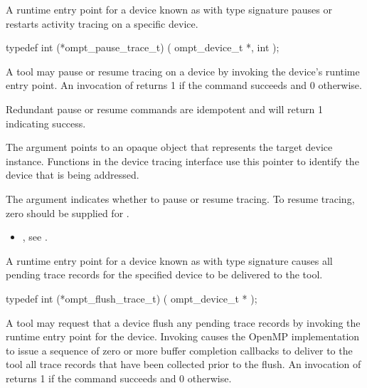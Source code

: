 \summary
A runtime entry point for a device known as 
with type signature 
pauses or restarts activity tracing on a specific device.

\begin{ccppspecific}
\begin{omptInquiry}
typedef int (*ompt_pause_trace_t) (
  ompt_device_t *,
  int 
);
\end{omptInquiry}
\end{ccppspecific}

\descr

A tool may pause or resume tracing on a device by invoking the device's
 runtime entry point.
An invocation of  returns 1 if the command
succeeds and 0 otherwise.

Redundant pause or resume commands are idempotent and will
return 1 indicating success.

\argdesc
The  argument points to an opaque object that represents
the target device instance. Functions in the device tracing interface
use this pointer to identify the device that is being addressed.

The argument  indicates whether to pause or
resume tracing.
To resume tracing, zero should be supplied for .

\crossreferences
\begin{itemize}
\item {},
see .
\end{itemize}

\label{sec:ompt_flush_trace_t}

\summary
A runtime entry point for a device known as 
with type signature  causes all pending trace 
records for the specified device to be delivered to the tool.

\begin{ccppspecific}
\begin{omptInquiry}
typedef int (*ompt_flush_trace_t) (
  ompt_device_t *
);
\end{omptInquiry}
\end{ccppspecific}

\descr

A tool may request that a device flush any pending trace records
by invoking the  runtime entry point for the device.
Invoking  causes the OpenMP implementation to issue a sequence 
of zero or more buffer completion callbacks to deliver to the tool all trace records 
that have been collected prior to the flush.
An invocation of  returns 1 if the command
succeeds and 0 otherwise.

